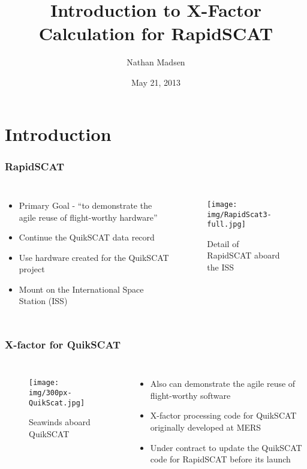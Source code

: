 \documentclass[10pt]{beamer}
\title{Introduction to X-Factor Calculation for RapidSCAT }
\author{Nathan Madsen}
\institute{MERS Lab\\Brigham Young University}
\date{May 21, 2013}
\begin{document}
{
  \frame{\titlepage}
}
\section{Introduction}
\begin{frame}
  \frametitle{RapidSCAT}

  \begin{columns}[c]

    \begin{itemize}
    \item Primary Goal - ``to demonstrate the agile reuse of flight-worthy hardware''
    \item Continue the QuikSCAT data record  
    \item Use hardware created for the QuikSCAT project
    \item Mount on the International Space Station (ISS)
    \end{itemize}

    \begin{figure}[h]
      \texttt{[image: img/RapidScat3-full.jpg]}
      \caption{Detail of RapidSCAT aboard the ISS}
      \label{RSonISS}
    \end{figure}

  \end{columns}
\end{frame}

\begin{frame}
  \frametitle{X-factor for QuikSCAT}
  \begin{columns}[c]

    \begin{figure}[h]
      \texttt{[image: img/300px-QuikScat.jpg]}
      \caption{Seawinds aboard QuikSCAT}
      \label{quikSCAT}
    \end{figure}

    \begin{itemize}
    \item Also can demonstrate the agile reuse of flight-worthy software
    \item X-factor processing code for QuikSCAT originally developed at MERS
    \item Under contract to update the QuikSCAT code for RapidSCAT before its launch
    \end{itemize}
  \end{columns}
\end{frame}
\end{document}
